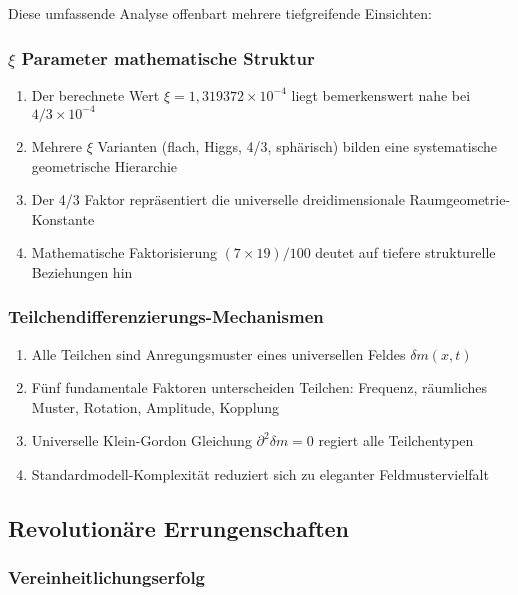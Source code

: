 \documentclass[12pt,a4paper]{article}
\newcommand{\xipar}{\ensuremath{\xi}}
\newcommand{\deltafield}{\ensuremath{\delta m}}
\newcommand{\mytimes}{\ensuremath{\times}}
\begin{document}
	Diese umfassende Analyse offenbart mehrere tiefgreifende Einsichten:
	
	\subsubsection{$\xi$ Parameter mathematische Struktur}
	\label{subsubsec:xi_mathematische_zusammenfassung}
	
	\begin{enumerate}
		\item Der berechnete Wert $\xipar = 1,319372 \mytimes 10^{-4}$ liegt bemerkenswert nahe bei $4/3 \mytimes 10^{-4}$
		\item Mehrere $\xi$ Varianten (flach, Higgs, 4/3, sphärisch) bilden eine systematische geometrische Hierarchie
		\item Der 4/3 Faktor repräsentiert die universelle dreidimensionale Raumgeometrie-Konstante
		\item Mathematische Faktorisierung $(7 \mytimes 19)/100$ deutet auf tiefere strukturelle Beziehungen hin
	\end{enumerate}
	
	\subsubsection{Teilchendifferenzierungs-Mechanismen}
	\label{subsubsec:teilchendifferenzierung_zusammenfassung}
	
	\begin{enumerate}
		\item Alle Teilchen sind Anregungsmuster eines universellen Feldes $\deltafield(x,t)$
		\item Fünf fundamentale Faktoren unterscheiden Teilchen: Frequenz, räumliches Muster, Rotation, Amplitude, Kopplung
		\item Universelle Klein-Gordon Gleichung $\partial^2\deltafield = 0$ regiert alle Teilchentypen
		\item Standardmodell-Komplexität reduziert sich zu eleganter Feldmustervielfalt
	\end{enumerate}
	
	\subsection{Revolutionäre Errungenschaften}
	\label{subsec:revolutionaere_errungenschaften}
	
	\subsubsection{Vereinheitlichungserfolg}
	\label{subsubsec:vereinheitlichungserfolg}
	
\end{document}
